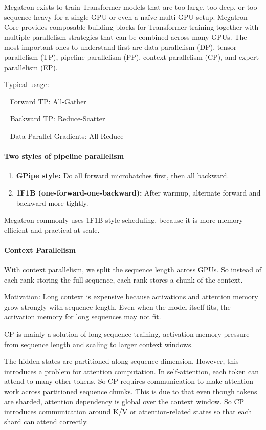 \documentclass[11pt]{article}  %
\begin{document}
Megatron exists to train Transformer models that are too large, too deep, or too sequence-heavy for a single GPU or even a naïve multi-GPU setup.
Megatron Core provides composable building blocks for Transformer training together with multiple parallelism strategies that can be combined across many GPUs.
The most important ones to understand first are data parallelism (DP), tensor parallelism (TP), pipeline parallelism (PP), context parallelism (CP), and expert parallelism (EP).

Typical usage:

\textbullet~ Forward TP:	 All-Gather

\textbullet~ Backward TP:	Reduce-Scatter

\textbullet~ Data Parallel Gradients:	All-Reduce

\paragraph{Two styles of pipeline parallelism}
\begin{enumerate}
  \item \textbf{GPipe style:} Do all forward microbatches first, then all backward.
  \item \textbf{1F1B (one-forward-one-backward):} After warmup, alternate forward and backward more tightly.
\end{enumerate}

Megatron commonly uses 1F1B-style scheduling, because it is more memory-efficient and practical at scale.

\paragraph{Context Parallelism}
With context parallelism, we split the sequence length across GPUs.
So instead of each rank storing the full sequence, each rank stores a chunk of the context.

Motivation: Long context is expensive because activations and attention memory grow strongly with sequence length.
Even when the model itself fits, the activation memory for long sequences may not fit.

CP is mainly a solution of long sequence training, activation memory pressure from sequence length and scaling to larger context windows.

The hidden states are partitioned along sequence dimension.
However, this introduces a problem for attention computation. 
In self-attention, each token can attend to many other tokens.
So CP requires communication to make attention work across partitioned sequence chunks.
This is due to that even though tokens are sharded, attention dependency is global over the context window.
So CP introduces communication around K/V or attention-related states so that each shard can attend correctly.
\end{document}
